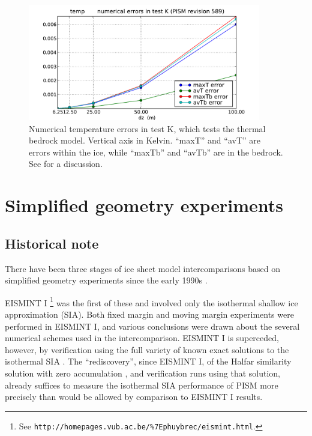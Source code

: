 \documentclass[11pt,final]{amsart}
\begin{document}
\begin{figure}[ht]
\includegraphics[width=4.0in,keepaspectratio=true]{figs/temperrs_K}
\caption{Numerical temperature errors in test K, which tests the thermal bedrock model.  Vertical axis in Kelvin.  ``maxT'' and ``avT'' are errors within the ice, while ``maxTb'' and ``avTb'' are in the bedrock.  See \cite{BuelerTestK} for a discussion.}
\label{fig:temperrsK}
\end{figure}


\clearpage\newpage
\section{Simplified geometry experiments}\label{sect:simp}

\subsection{Historical note}  There have been three stages of ice sheet model intercomparisons based on simplified geometry experiments since the early 1990s \cite{BuelerSpray}.

EISMINT I \cite[ European Ice Sheet Modeling INiTiative]{EISMINT96}\footnote{See \texttt{http://homepages.vub.ac.be/\%7Ephuybrec/eismint.html}.} was the first of these and involved only the isothermal shallow ice approximation (SIA).  Both fixed margin and moving margin experiments were performed in EISMINT I, and various conclusions were drawn about the several numerical schemes used in the intercomparison.  EISMINT I is superceded, however, by verification using the full variety of known exact solutions to the isothermal SIA \cite{BLKCB}.  The ``rediscovery'', since EISMINT I, of the Halfar similarity solution with zero accumulation \cite{Halfar83}, and verification runs using that solution, already suffices to measure the isothermal SIA performance of PISM more precisely than would be allowed by comparison to EISMINT I results.
\end{document}
